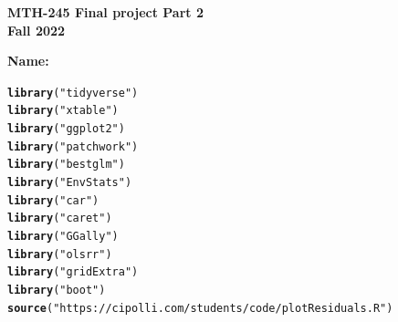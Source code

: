 \documentclass{article}\usepackage[]{graphicx}\usepackage[]{xcolor}
\makeatletter
\newcommand{\hlstr}[1]{\textcolor[rgb]{0.192,0.494,0.8}{#1}}%
\newcommand{\hlstd}[1]{\textcolor[rgb]{0.345,0.345,0.345}{#1}}%
\newcommand{\hlkwd}[1]{\textcolor[rgb]{0.737,0.353,0.396}{\textbf{#1}}}%
\newenvironment{kframe}{%
 \def\at@end@of@kframe{}%
 \ifinner\ifhmode%
  \def\at@end@of@kframe{\end{minipage}}%
  \begin{minipage}{\columnwidth}%
 \fi\fi%
 \def\FrameCommand##1{\hskip\@totalleftmargin \hskip-\fboxsep
 \colorbox{shadecolor}{##1}\hskip-\fboxsep
     \hskip-\linewidth \hskip-\@totalleftmargin \hskip\columnwidth}%
 \MakeFramed {\advance\hsize-\width
   \@totalleftmargin\z@ \linewidth\hsize
   \@setminipage}}%
 {\par\unskip\endMakeFramed%
 \at@end@of@kframe}
\newenvironment{knitrout}{}{} %
\makeatother
\begin{document}
\begin{center}
\textbf{MTH-245 Final project Part 2} \\
\textbf{Fall 2022}\\
\end{center}

\vspace{.3cm}

\textbf{Name: } 

\vspace{.3cm}

\begin{knitrout}
\color{fgcolor}\begin{kframe}
\begin{alltt}
\hlkwd{library}\hlstd{(}\hlstr{"tidyverse"}\hlstd{)}
\hlkwd{library}\hlstd{(}\hlstr{"xtable"}\hlstd{)}
\hlkwd{library}\hlstd{(}\hlstr{"ggplot2"}\hlstd{)}
\hlkwd{library}\hlstd{(}\hlstr{"patchwork"}\hlstd{)}
\hlkwd{library}\hlstd{(}\hlstr{"bestglm"}\hlstd{)}
\hlkwd{library}\hlstd{(}\hlstr{"EnvStats"}\hlstd{)}
\hlkwd{library}\hlstd{(}\hlstr{"car"}\hlstd{)}
\hlkwd{library}\hlstd{(}\hlstr{"caret"}\hlstd{)}
\hlkwd{library}\hlstd{(}\hlstr{"GGally"}\hlstd{)}
\hlkwd{library}\hlstd{(}\hlstr{"olsrr"}\hlstd{)}
\hlkwd{library}\hlstd{(}\hlstr{"gridExtra"}\hlstd{)}
\hlkwd{library}\hlstd{(}\hlstr{"boot"}\hlstd{)}
\hlkwd{source}\hlstd{(}\hlstr{"https://cipolli.com/students/code/plotResiduals.R"}\hlstd{)}
\end{alltt}
\end{kframe}
\end{knitrout}
\end{document}
